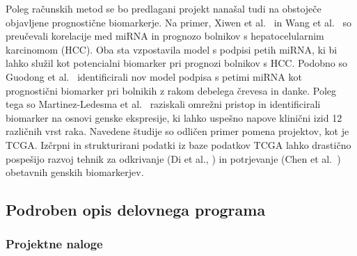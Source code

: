 \documentclass[11pt,a4paper]{article}
\begin{document}
Poleg računskih metod se bo predlagani projekt nanašal tudi na obstoječe objavljene prognostične biomarkerje. Na primer, Xiwen et al.~\cite{liao2018identification} in Wang et al.~\cite{33313167} so preučevali korelacije med miRNA in prognozo bolnikov s hepatocelularnim karcinomom (HCC). Oba sta vzpostavila model s podpisi petih miRNA, ki bi lahko služil kot potencialni biomarker pri prognozi bolnikov s HCC. Podobno so Guodong et al.~\cite{31799184} identificirali nov model podpisa s petimi miRNA kot prognostični biomarker pri bolnikih z rakom debelega črevesa in danke. Poleg tega so Martinez-Ledesma et al.~\cite{26202601} raziskali omrežni pristop in identificirali biomarker na osnovi genske ekspresije, ki lahko uspešno napove klinični izid 12 različnih vrst raka. Navedene študije so odličen primer pomena projektov, kot je TCGA. Izčrpni in strukturirani podatki iz baze podatkov TCGA lahko drastično pospešijo razvoj tehnik za odkrivanje (Di et al., \cite{29676997}) in potrjevanje (Chen et al.~\cite{32289666}) obetavnih genskih biomarkerjev.



\subsection{Podroben opis delovnega programa}

\subsubsection{Projektne naloge}
\end{document}
